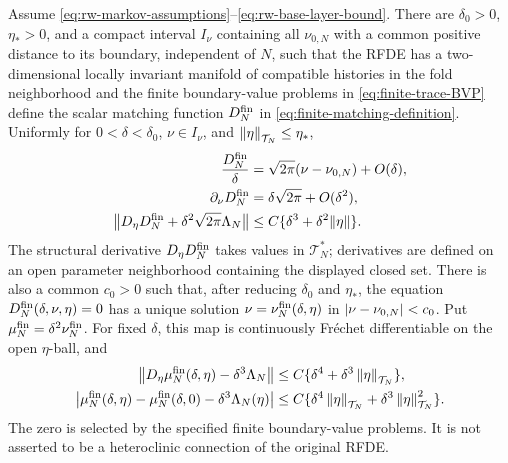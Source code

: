 \begin{theorem}
\label{thm:rw-local-fold-matching}
Assume \eqref{eq:rw-markov-assumptions}--\eqref{eq:rw-base-layer-bound}.
There are \(\delta_0>0\), \(\eta_*>0\), and a compact interval \(I_\nu\)
containing all \(\nu_{0,N}\) with a common positive distance to its boundary,
independent of \(N\), such that the RFDE has a two-dimensional locally
invariant manifold of compatible histories in the fold neighborhood and the
finite boundary-value problems in \cref{eq:finite-trace-BVP} define the scalar
matching function \(D_N^{\rm fin}\) in
\cref{eq:finite-matching-definition}.  Uniformly for
\(0<\delta<\delta_0\), \(\nu\in I_\nu\), and
\(\left\lVert\eta\right\rVert_{\mathcal T_N}\le\eta_*\),
\begin{align}
 \frac{D_N^{\rm fin}}{\delta}
 &=\sqrt{2\pi}(\nu-\nu_{0,N})+O(\delta),
                                                        \label{eq:finite-comparison-level}\\
 \partial_\nu D_N^{\rm fin}
 &=\delta\sqrt{2\pi}+O(\delta^2),
                                                        \label{eq:finite-comparison-slope}\\
 \bigl\|D_\eta D_N^{\rm fin}
       +\delta^2\sqrt{2\pi}\Lambda_N\bigr\|
 &\le C\{\delta^3+\delta^2\|\eta\|\}.             \label{eq:finite-comparison-structural}
\end{align}
The structural derivative \(D_\eta D_N^{\rm fin}\) takes values in
\(\mathcal T_N^*\); derivatives are defined on an open parameter
neighborhood containing the displayed closed set.  There is also a common
\(c_0>0\) such that, after reducing \(\delta_0\) and \(\eta_*\), the equation
\(D_N^{\rm fin}(\delta,\nu,\eta)=0\) has a unique solution
\(\nu=\nu_N^{\rm fin}(\delta,\eta)\) in
\(\left\lvert\nu-\nu_{0,N}\right\rvert<c_0\).  Put
\(\mu_N^{\rm fin}=\delta^2\nu_N^{\rm fin}\).  For fixed \(\delta\), this
map is continuously Fr\'echet differentiable on the open \(\eta\)-ball, and
\begin{align}
 \left\lVert D_\eta\mu_N^{\rm fin}(\delta,\eta)-\delta^3\Lambda_N\right\rVert
 &\le C\{\delta^4+\delta^3\left\lVert\eta\right\rVert_{\mathcal T_N}\},
 \label{eq:rw-local-root-sensitivity}\\
 \left\lvert\mu_N^{\rm fin}(\delta,\eta)-\mu_N^{\rm fin}(\delta,0)
              -\delta^3\Lambda_N(\eta)\right\rvert
 &\le C\{\delta^4\left\lVert\eta\right\rVert_{\mathcal T_N}
            +\delta^3\left\lVert\eta\right\rVert_{\mathcal T_N}^2\}.
 \label{eq:rw-local-root-increment}
\end{align}
The zero is selected by the specified finite boundary-value problems.
It is not asserted to be a heteroclinic connection of the original RFDE.
\end{theorem}


